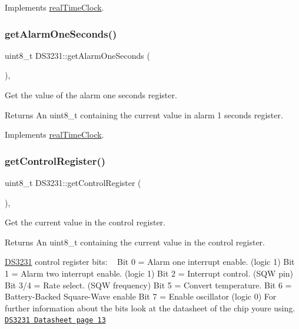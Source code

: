 Implements \mbox{\hyperlink{classreal_time_clock_a0b3babca96f8246d4bb5e3ac2a95801d}{real\+Time\+Clock}}.

\mbox{\label{class_d_s3231_afd2b16482de8abc10981fdfca0e181a6}} 
\subsubsection{\texorpdfstring{get\+Alarm\+One\+Seconds()}{getAlarmOneSeconds()}}
{\footnotesize\ttfamily uint8\+\_\+t D\+S3231\+::get\+Alarm\+One\+Seconds (\begin{DoxyParamCaption}{ }\end{DoxyParamCaption})\hspace{0.3cm}{\ttfamily [override]}, {\ttfamily [virtual]}}



Get the value of the alarm one seconds register. 

\begin{DoxyReturn}{Returns}
An uint8\+\_\+t containing the current value in alarm 1 seconds register. 
\end{DoxyReturn}


Implements \mbox{\hyperlink{classreal_time_clock_af4ff1775432a08af7e41db135d16bf65}{real\+Time\+Clock}}.

\mbox{\label{class_d_s3231_a2e023e091c63208290e275874552a716}} 
\subsubsection{\texorpdfstring{get\+Control\+Register()}{getControlRegister()}}
{\footnotesize\ttfamily uint8\+\_\+t D\+S3231\+::get\+Control\+Register (\begin{DoxyParamCaption}{ }\end{DoxyParamCaption})\hspace{0.3cm}{\ttfamily [override]}, {\ttfamily [virtual]}}



Get the current value in the control register. 

\begin{DoxyReturn}{Returns}
An uint8\+\_\+t containing the current value in the control register.
\end{DoxyReturn}
\mbox{\hyperlink{class_d_s3231}{D\+S3231}} control register bits\+: ~\newline
Bit 0 = Alarm one interrupt enable. (logic 1) Bit 1 = Alarm two interrupt enable. (logic 1) Bit 2 = Interrupt control. (S\+QW pin) Bit 3/4 = Rate select. (S\+QW frequency) Bit 5 = Convert temperature. Bit 6 = Battery-\/\+Backed Square-\/\+Wave enable Bit 7 = Enable oscillator (logic 0) For further information about the bits look at the datasheet of the chip you\textquotesingle{}re using. \href{https://datasheets.maximintegrated.com/en/ds/DS3231.pdf}{\tt D\+S3231 Datasheet page 13} 

